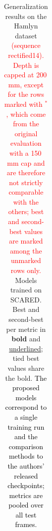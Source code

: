 \documentclass[a4paper,fleqn]{cas-dc}
\begin{document}
{\begin{table}[!hbt]
\begin{tabular}{clccccccc}
\bottomrule
\end{tabular}
\caption{Generalization results on the Hamlyn dataset \textcolor{red}{(sequence rectified14). Depth is capped at 200\,mm, except for the rows marked with $^{\ast}$, which come from the original evaluation with a 150\,mm cap and are therefore not strictly comparable with the others; best and second-best values are marked among the unmarked rows only.} 
Models trained on SCARED. Best and second-best 
per metric in \textbf{bold} and \underline{underlined}; tied best values share the bold. \textcolor{black}{The proposed models correspond to a single training run and the comparison methods to the authors' released checkpoints; metrics are pooled over all test frames.}}
\label{tab:quant_hamlyn}
\end{table}


}
\end{document}
